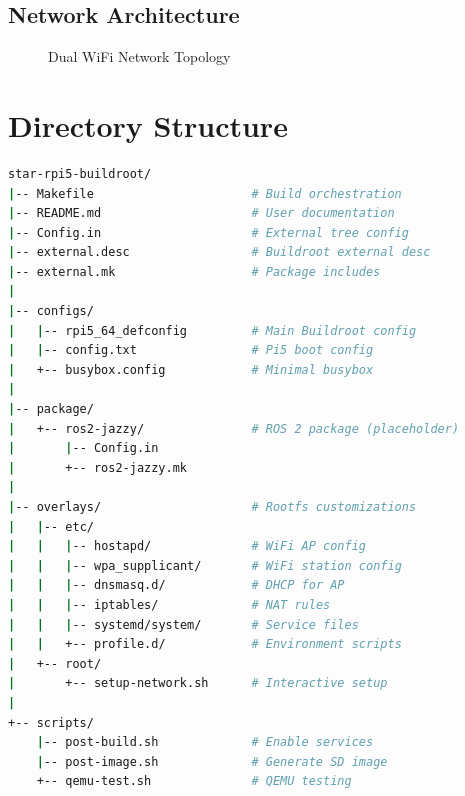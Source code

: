 \documentclass[11pt,letterpaper]{article}
\begin{document}
\subsection{Network Architecture}

\begin{figure}[H]
\centering
{}
\caption{Dual WiFi Network Topology}
\end{figure}

\section{Directory Structure}

\begin{lstlisting}[language=bash]
star-rpi5-buildroot/
|-- Makefile                      # Build orchestration
|-- README.md                     # User documentation
|-- Config.in                     # External tree config
|-- external.desc                 # Buildroot external desc
|-- external.mk                   # Package includes
|
|-- configs/
|   |-- rpi5_64_defconfig         # Main Buildroot config
|   |-- config.txt                # Pi5 boot config
|   +-- busybox.config            # Minimal busybox
|
|-- package/
|   +-- ros2-jazzy/               # ROS 2 package (placeholder)
|       |-- Config.in
|       +-- ros2-jazzy.mk
|
|-- overlays/                     # Rootfs customizations
|   |-- etc/
|   |   |-- hostapd/              # WiFi AP config
|   |   |-- wpa_supplicant/       # WiFi station config
|   |   |-- dnsmasq.d/            # DHCP for AP
|   |   |-- iptables/             # NAT rules
|   |   |-- systemd/system/       # Service files
|   |   +-- profile.d/            # Environment scripts
|   +-- root/
|       +-- setup-network.sh      # Interactive setup
|
+-- scripts/
    |-- post-build.sh             # Enable services
    |-- post-image.sh             # Generate SD image
    +-- qemu-test.sh              # QEMU testing
\end{lstlisting}
\end{document}
